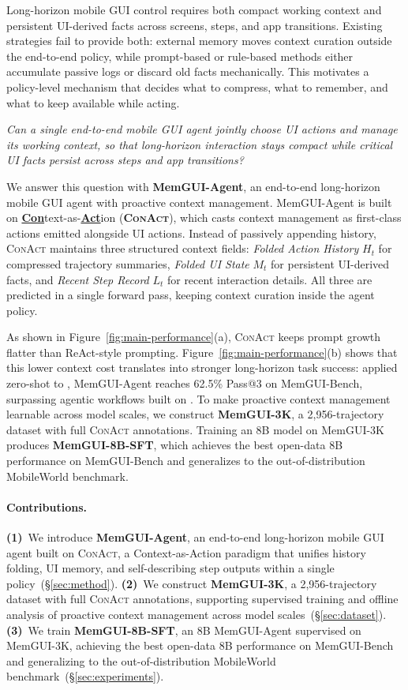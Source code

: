 \documentclass{llmxive}
\providecommand{\obsbox}[1]{  \begin{tcolorbox}[colframe=black!50, colback=cvprblue!8, boxrule=1.2pt, arc=2mm,
    top=4pt, bottom=4pt, left=6pt, right=6pt, boxsep=2pt, fontupper=\itshape]
    #1
  \end{tcolorbox}
}
\providecommand{\llmname}[1]{{\fontfamily{pcr}\selectfont{#1}}}
\providecommand{\ourmethod}{MemGUI-Agent\xspace}
\providecommand{\conact}{\textsc{ConAct}\xspace}
\begin{document}
Long-horizon mobile GUI control requires both compact working context and persistent UI-derived facts across screens, steps, and app transitions. Existing strategies fail to provide both: external memory moves context curation outside the end-to-end policy, while prompt-based or rule-based methods either accumulate passive logs or discard old facts mechanically. This motivates a policy-level mechanism that decides what to compress, what to remember, and what to keep available while acting.

\obsbox{\textit{Can a single end-to-end mobile GUI agent jointly choose UI actions and manage its working context, so that long-horizon interaction stays compact while critical UI facts persist across steps and app transitions?}}

We answer this question with \textbf{\ourmethod}, an end-to-end long-horizon mobile GUI agent with proactive context management. \ourmethod is built on \textbf{\underline{Con}}text-as-\textbf{\underline{Act}}ion (\textbf{\conact}), which casts context management as first-class actions emitted alongside UI actions. Instead of passively appending history, \conact maintains three structured context fields: \emph{Folded Action History} $H_t$ for compressed trajectory summaries, \emph{Folded UI State} $M_t$ for persistent UI-derived facts, and \emph{Recent Step Record} $L_t$ for recent interaction details. All three are predicted in a single forward pass, keeping context curation inside the agent policy.

As shown in Figure~\ref{fig:main-performance}(a), \conact keeps prompt growth flatter than ReAct-style prompting. Figure~\ref{fig:main-performance}(b) shows that this lower context cost translates into stronger long-horizon task success: applied zero-shot to \llmname{Qwen3-VL-235B-Thinking}, \ourmethod reaches 62.5\% Pass@3 on MemGUI-Bench, surpassing agentic workflows built on \llmname{Gemini-2.5-Pro}. To make proactive context management learnable across model scales, we construct \textbf{MemGUI-3K}, a 2{,}956-trajectory dataset with full \conact annotations. Training an 8B model on MemGUI-3K produces \textbf{MemGUI-8B-SFT}, which achieves the best open-data 8B performance on MemGUI-Bench and generalizes to the out-of-distribution MobileWorld benchmark.

\paragraph{Contributions.}
\textbf{(1)}~We introduce \textbf{\ourmethod}, an end-to-end long-horizon mobile GUI agent built on \conact, a Context-as-Action paradigm that unifies history folding, UI memory, and self-describing step outputs within a single policy~(\S\ref{sec:method}).
\textbf{(2)}~We construct \textbf{MemGUI-3K}, a 2{,}956-trajectory dataset with full \conact annotations, supporting supervised training and offline analysis of proactive context management across model scales~(\S\ref{sec:dataset}).
\textbf{(3)}~We train \textbf{MemGUI-8B-SFT}, an 8B \ourmethod supervised on MemGUI-3K, achieving the best open-data 8B performance on MemGUI-Bench and generalizing to the out-of-distribution MobileWorld benchmark~(\S\ref{sec:experiments}).
\end{document}
